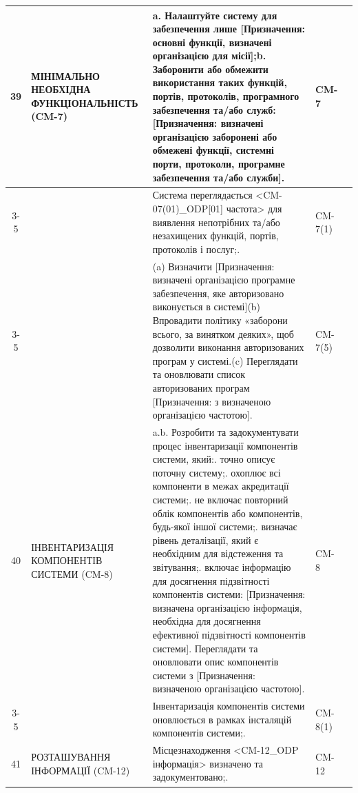 \documentclass[10pt]{article}
\begin{document}
\begin{longtable}{|c|>{\raggedright\arraybackslash}p{4cm}|>{\raggedright\arraybackslash}p{6cm}|>{\raggedright\arraybackslash}p{1.5cm}|>{\raggedright\arraybackslash}p{3.5cm}|}
39 & МІНІМАЛЬНО НЕОБХІДНА ФУНКЦІОНАЛЬНІСТЬ (CM-7) & a. Налаштуйте систему для забезпечення лише [Призначення: основні функції, визначені організацією для місії];\newline b. Заборонити або обмежити використання таких функцій, портів, протоколів, програмного забезпечення та/або служб: [Призначення: визначені організацією заборонені або обмежені функції, системні порти, протоколи, програмне забезпечення та/або служби]. & CM-7 & \\ \cline{3-5}
 &  & Система переглядається <CM-07(01)\_\allowbreak{}ODP[01] частота> для виявлення непотрібних та/або незахищених функцій, портів, протоколів і послуг;.\newline  & CM-7(1) & \\ \cline{3-5}
 &  & (a) Визначити [Призначення: визначені організацією програмне забезпечення, яке авторизовано виконується в системі]\newline (b) Впровадити політику «заборони всього, за винятком деяких», щоб дозволити виконання авторизованих програм у системі.\newline (c) Переглядати та оновлювати список авторизованих програм [Призначення: з визначеною організацією частотою]. & CM-7(5) & \\ \hline
40 & ІНВЕНТАРИЗАЦІЯ КОМПОНЕНТІВ СИСТЕМИ (CM-8) & a.\newline b. Розробити та задокументувати процес інвентаризації компонентів системи, який:\newline 1. точно описує поточну систему;\newline 2. охоплює всі компоненти в межах акредитації системи;\newline 3. не включає повторний облік компонентів або компонентів, будь-якої іншої системи;\newline 4. визначає рівень деталізації, який є необхідним для відстеження та звітування;\newline 5. включає інформацію для досягнення підзвітності компонентів системи: [Призначення: визначена організацією інформація, необхідна для досягнення ефективної підзвітності компонентів системи]. Переглядати та оновлювати опис компонентів системи з [Призначення: визначеною організацією частотою]. & CM-8 & \\ \cline{3-5}
 &  & Інвентаризація компонентів системи оновлюється в рамках інсталяцій компонентів системи;.\newline  & CM-8(1) & \\ \hline
41 & РОЗТАШУВАННЯ ІНФОРМАЦІЇ (CM-12) & Місцезнаходження <CM-12\_\allowbreak{}ODP інформація> визначено та задокументовано;.\newline  & CM-12 & \\ \hline

\end{longtable}
\end{document}
